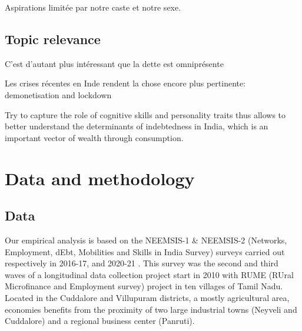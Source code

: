\documentclass[a4paper, 11pt, onecolumn]{article}
\begin{document}
Aspirations limitée par notre caste et notre sexe.










	\subsection{Topic relevance}



C'est d'autant plus intéressant que la dette est omniprésente \cite{Guerin2013a, Guerin2020}

Les crises récentes en Inde rendent la chose encore plus pertinente: demonetisation \cite{GuerinDemo2017} and lockdown \cite{Guerin2020}

Try to capture the role of cognitive skills and personality traits thus allows to better understand the determinants of indebtedness in India, which is an important vector of wealth through consumption. 












\newpage
\section{Data and methodology}


	\subsection{Data}

Our empirical analysis is based on the NEEMSIS-1 \& NEEMSIS-2 (Networks, Employment, dEbt, Mobilities and Skills in India Survey) surveys carried out respectively in 2016-17, and 2020-21 \citep{NEEMSISreport, NEEMSIS2017}.
This survey was the second and third waves of a longitudinal data collection project start in 2010 with RUME (RUral Microfinance and Employment survey) project in ten villages of Tamil Nadu.
Located in the Cuddalore and Villupuram districts, a mostly agricultural area, economies benefits from the proximity of two large industrial towns (Neyveli and Cuddalore) and a regional business center (Panruti).
\end{document}
